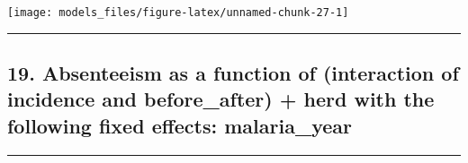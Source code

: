 \documentclass[]{article}
\begin{document}
\begin{center}\texttt{[image: models\_files/figure-latex/unnamed-chunk-27-1]} \end{center}

\newpage

\begin{center}\rule{0.5\linewidth}{\linethickness}\end{center}

\subsection{19. Absenteeism as a function of (interaction of incidence
and before\_after) + herd with the following fixed effects:
malaria\_year}\label{absenteeism-as-a-function-of-interaction-of-incidence-and-before_after-herd-with-the-following-fixed-effects-malaria_year}

\begin{center}\rule{0.5\linewidth}{\linethickness}\end{center}
\end{document}
